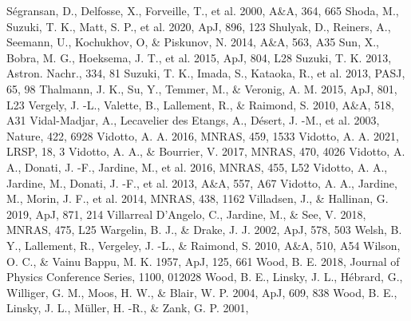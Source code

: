 \documentclass[preprint]{aastex}
\begin{document}
\begin{thebibliography}{}
S\'{e}gransan, D., Delfosse, X., Forveille, T., et al. 2000,
  A\&A, 364, 665
Shoda, M., Suzuki, T. K., Matt, S. P., et al. 2020, ApJ, 896, 123
Shulyak, D., Reiners, A., Seemann, U., Kochukhov, O, \& Piskunov, N. 2014,
  A\&A, 563, A35
Sun, X., Bobra, M. G., Hoeksema, J. T., et al. 2015, ApJ, 804, L28
Suzuki, T. K. 2013, Astron. Nachr., 334, 81
Suzuki, T. K., Imada, S., Kataoka, R., et al. 2013, PASJ, 65, 98
Thalmann, J. K., Su, Y., Temmer, M., \& Veronig, A. M. 2015, ApJ, 801, L23
Vergely, J. -L., Valette, B., Lallement, R., \& Raimond, S. 2010,
  A\&A, 518, A31
Vidal-Madjar, A., Lecavelier des Etangs, A., D\'{e}sert, J. -M., et al.
  2003, Nature, 422, 6928
Vidotto, A. A. 2016, MNRAS, 459, 1533
Vidotto, A. A. 2021, LRSP, 18, 3
Vidotto, A. A., \& Bourrier, V. 2017, MNRAS, 470, 4026
Vidotto, A. A., Donati, J. -F., Jardine, M., et al. 2016, MNRAS, 455, L52
Vidotto, A. A., Jardine, M., Donati, J. -F., et al. 2013, A\&A, 557, A67
Vidotto, A. A., Jardine, M., Morin, J. F., et al. 2014, MNRAS, 438, 1162
Villadsen, J., \& Hallinan, G. 2019, ApJ, 871, 214
Villarreal D'Angelo, C., Jardine, M., \& See, V. 2018, MNRAS, 475, L25
Wargelin, B. J., \& Drake, J. J. 2002, ApJ, 578, 503
Welsh, B. Y., Lallement, R., Vergeley, J. -L., \& Raimond, S. 2010,
  A\&A, 510, A54
Wilson, O. C., \& Vainu Bappu, M. K. 1957, ApJ, 125, 661
Wood, B. E. 2018, Journal of Physics Conference Series, 1100, 012028
Wood, B. E., Linsky, J. L., H\'{e}brard, G., Williger, G. M., Moos, H. W.,
  \& Blair, W. P. 2004, ApJ, 609, 838
Wood, B. E., Linsky, J. L., M{\"u}ller, H. -R., \& Zank, G. P. 2001,

\end{thebibliography}
\end{document}
